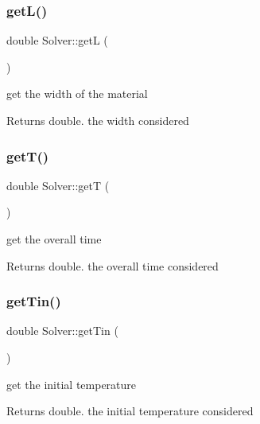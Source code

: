 \subsubsection{\texorpdfstring{get\+L()}{getL()}}
{\footnotesize\ttfamily double Solver\+::getL (\begin{DoxyParamCaption}{ }\end{DoxyParamCaption})}

get the width of the material
\begin{DoxyItemize}
\item \begin{DoxyReturn}{Returns}
double. the width considered 
\end{DoxyReturn}

\end{DoxyItemize}\mbox{\label{classSolver_a7a09182372f91099da1cba8b1527e4c7}} 
\subsubsection{\texorpdfstring{get\+T()}{getT()}}
{\footnotesize\ttfamily double Solver\+::getT (\begin{DoxyParamCaption}{ }\end{DoxyParamCaption})}

get the overall time
\begin{DoxyItemize}
\item \begin{DoxyReturn}{Returns}
double. the overall time considered 
\end{DoxyReturn}

\end{DoxyItemize}\mbox{\label{classSolver_ac091deb09ce1bb4bf2f70b6af3a2d6c2}} 
\subsubsection{\texorpdfstring{get\+Tin()}{getTin()}}
{\footnotesize\ttfamily double Solver\+::get\+Tin (\begin{DoxyParamCaption}{ }\end{DoxyParamCaption})}

get the initial temperature
\begin{DoxyItemize}
\item \begin{DoxyReturn}{Returns}
double. the initial temperature considered 
\end{DoxyReturn}

\end{DoxyItemize}\mbox{\label{classSolver_a652cc726a9f3e46239e3a2953e95495c}} 
